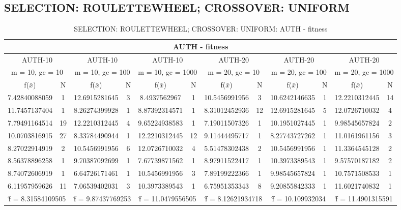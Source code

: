 \subsection{SELECTION: ROULETTEWHEEL; CROSSOVER: UNIFORM}
\begin{table}[H]
	\centering
	\caption{SELECTION: ROULETTEWHEEL; CROSSOVER: UNIFORM: AUTH - fitness}
	\begin{adjustbox}{width=1\textwidth}
		\begin{tabular}{ |c|c||c|c||c|c||c|c||c|c||c|c| }
			\hline
			\multicolumn{12}{|c|}{AUTH - fitness} \\
			\hline
			\multicolumn{2}{|c||}{AUTH-10} & \multicolumn{2}{c||}{AUTH-10} & \multicolumn{2}{c||}{AUTH-10} & \multicolumn{2}{c||}{AUTH-20} & \multicolumn{2}{c||}{AUTH-20} & \multicolumn{2}{c|}{AUTH-20}\\
			\hline
			\multicolumn{2}{|c||}{m = 10, gc = 10} & \multicolumn{2}{c||}{m = 10, gc = 100} & \multicolumn{2}{c||}{m = 10, gc = 1000} & \multicolumn{2}{c||}{m = 20, gc = 10} & \multicolumn{2}{c||}{m = 20, gc = 100} & \multicolumn{2}{c|}{m = 20, gc = 1000}\\
			\hline
			f($\bar{x}$) & N & f($\bar{x}$) & N & f($\bar{x}$) & N & f($\bar{x}$) & N & f($\bar{x}$) & N & f($\bar{x}$) & N\\
			\hline
			\hline
			7.42840088059 & 1 & 12.6915281645 & 3 & 8.4937562967 & 1 & 10.5456991956 & 3 & 10.6242146635 & 1 & 12.2210312445 & 14\\
			11.7457137404 & 1 & 8.26274399928 & 1 & 8.87392314571 & 1 & 8.31012452936 & 12 & 12.6915281645 & 5 & 12.0726710032 & 4\\
			7.79491164514 & 19 & 12.2210312445 & 4 & 9.65224938583 & 1 & 7.19011507326 & 1 & 10.1951027445 & 1 & 9.98545657824 & 2\\
			10.0703816915 & 27 & 8.33784490944 & 1 & 12.2210312445 & 12 & 9.11444495717 & 1 & 8.27743727262 & 1 & 11.0161961156 & 3\\
			8.27022914919 & 2 & 10.5456991956 & 6 & 12.0726710032 & 4 & 5.51478302438 & 2 & 10.5456991956 & 1 & 11.3364545128 & 2\\
			8.56378896258 & 1 & 9.70387092699 & 1 & 7.67739871562 & 1 & 8.97911522417 & 1 & 10.3973389543 & 1 & 9.57570187182 & 2\\
			8.74072606919 & 1 & 6.64726171461 & 1 & 10.5456991956 & 3 & 7.89199222366 & 1 & 9.98545657824 & 1 & 10.7571508533 & 1\\
			6.11957959626 & 11 & 7.06539402031 & 3 & 10.3973389543 & 1 & 6.75951353343 & 8 & 9.20855842333 & 1 & 11.6021740832 & 1\\
			\hline
			\multicolumn{2}{|c||}{\^{f} = 8.31584109505} & \multicolumn{2}{c||}{\^{f} = 9.87437769253} & \multicolumn{2}{c||}{\^{f} = 11.0479556505} & \multicolumn{2}{c||}{\^{f} = 8.12621934718} & \multicolumn{2}{c||}{\^{f} = 10.109932034} & \multicolumn{2}{c|}{\^{f} = 11.4901315591}\\
			\hline
		\end{tabular}
	\end{adjustbox}
\end{table}
